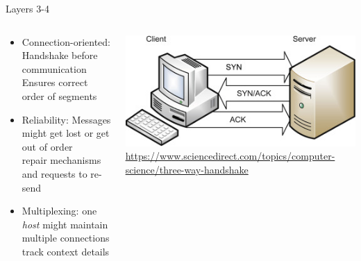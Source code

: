 \begin{frame}[fragile]{Layers 3-4}
\begin{columns}
\begin{itemize}
\begin{itemize}
		\begin{itemize}
		\item Connection-oriented: Handshake before communication \\
			\Thus Ensures correct order of segments
		\item Reliability: Messages might get lost or get out of order \\
			\Thus repair mechanisms and requests to re-send
		\item Multiplexing: one \emph{host} might maintain multiple connections \\
			\Thus track context details
		\end{itemize}
	\end{itemize}
\end{itemize}
%
\includegraphics[width=\linewidth]{./gfx/20-tcp-handshake}
{\tiny {}
 \url{https://www.sciencedirect.com/topics/computer-science/three-way-handshake}\\}
\end{columns}
%
\end{frame}



